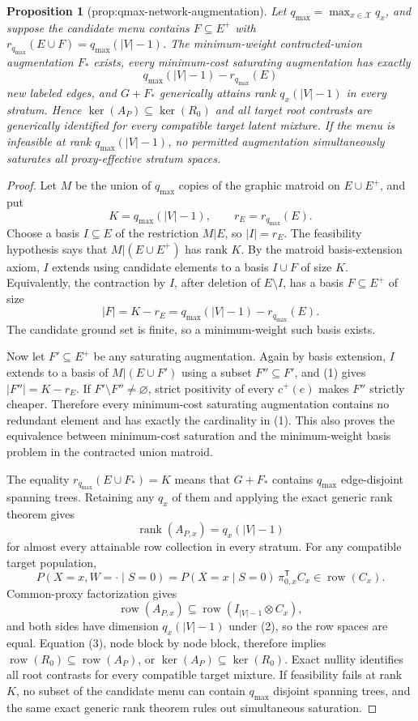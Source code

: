 \documentclass{article}
\newtheorem{proposition}{Proposition}
\begin{document}
\begin{proposition}[prop:qmax-network-augmentation]\label{prop:qmax-network-augmentation}
Let \(q_{\max}=\max_{x\in\mathcal X}q_x\), and suppose the candidate menu contains \(F\subseteq E^+\) with \(r_{q_{\max}}(E\cup F)=q_{\max}(|V|-1)\).  The minimum-weight contracted-union augmentation \(F_*\) exists, every minimum-cost saturating augmentation has exactly
\[
q_{\max}(|V|-1)-r_{q_{\max}}(E)
\]
new labeled edges, and \(G+F_*\) generically attains rank \(q_x(|V|-1)\) in every stratum.  Hence \(\ker(A_P)\subseteq\ker(R_0)\) and all target root contrasts are generically identified for every compatible target latent mixture.  If the menu is infeasible at rank \(q_{\max}(|V|-1)\), no permitted augmentation simultaneously saturates all proxy-effective stratum spaces.
\end{proposition}
\begin{proof}
Let \(M\) be the union of \(q_{\max}\) copies of the graphic matroid on \(E\cup E^+\), and put
\[
K=q_{\max}(|V|-1),\qquad r_E=r_{q_{\max}}(E).
\]
Choose a basis \(I\subseteq E\) of the restriction \(M|E\), so \(|I|=r_E\).  The feasibility hypothesis says that \(M|(E\cup E^+)\) has rank \(K\).  By the matroid basis-extension axiom, \(I\) extends using candidate elements to a basis \(I\cup F\) of size \(K\).  Equivalently, the contraction by \(I\), after deletion of \(E\setminus I\), has a basis \(F\subseteq E^+\) of size
\[
|F|=K-r_E=q_{\max}(|V|-1)-r_{q_{\max}}(E).
\tag{1}
\]
The candidate ground set is finite, so a minimum-weight such basis exists.

Now let \(F'\subseteq E^+\) be any saturating augmentation.  Again by basis extension, \(I\) extends to a basis of \(M|(E\cup F')\) using a subset \(F''\subseteq F'\), and (1) gives \(|F''|=K-r_E\).  If \(F'\setminus F''\ne\varnothing\), strict positivity of every \(c^+(e)\) makes \(F''\) strictly cheaper.  Therefore every minimum-cost saturating augmentation contains no redundant element and has exactly the cardinality in (1).  This also proves the equivalence between minimum-cost saturation and the minimum-weight basis problem in the contracted union matroid.

The equality \(r_{q_{\max}}(E\cup F_*)=K\) means that \(G+F_*\) contains \(q_{\max}\) edge-disjoint spanning trees.  Retaining any \(q_x\) of them and applying the exact generic rank theorem gives
\[
\operatorname{rank}(A_{P,x})=q_x(|V|-1)
\tag{2}
\]
for almost every attainable row collection in every stratum.  For any compatible target population,
\[
P(X=x,W=\cdot\mid S=0)
=P(X=x\mid S=0)\,\pi_{0,x}^{\mathsf T}C_x
\in\operatorname{row}(C_x).
\tag{3}
\]
Common-proxy factorization gives
\[
\operatorname{row}(A_{P,x})
\subseteq\operatorname{row}(I_{|V|-1}\otimes C_x),
\]
and both sides have dimension \(q_x(|V|-1)\) under (2), so the row spaces are equal.  Equation (3), node block by node block, therefore implies \(\operatorname{row}(R_0)\subseteq\operatorname{row}(A_P)\), or \(\ker(A_P)\subseteq\ker(R_0)\).  Exact nullity identifies all root contrasts for every compatible target mixture.  If feasibility fails at rank \(K\), no subset of the candidate menu can contain \(q_{\max}\) disjoint spanning trees, and the same exact generic rank theorem rules out simultaneous saturation.
\end{proof}
\end{document}
